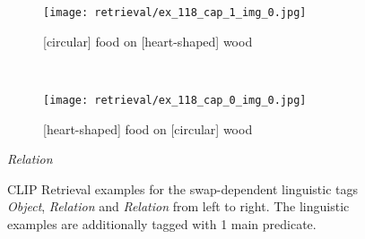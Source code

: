 \begin{figure}[ht]
\begin{minipage}[t]{.30\textwidth}
        \begin{subfigure}[t]{\textwidth}
        \centering
        \texttt{[image: retrieval/ex\_118\_cap\_1\_img\_0.jpg]}
        \caption{[circular] food on [heart-shaped] wood}
        \end{subfigure}\\
        \begin{subfigure}[t]{\textwidth}
        \centering
        \texttt{[image: retrieval/ex\_118\_cap\_0\_img\_0.jpg]}
        \caption{[heart-shaped] food on [circular] wood}
        \end{subfigure}%
        \caption*{\textit{Relation}}
    \end{minipage}%
    \caption{CLIP Retrieval examples for the swap-dependent linguistic tags \textit{Object}, \textit{Relation} and \textit{Relation} from left to right. The linguistic examples are additionally tagged with 1 main predicate.}
    \label{fig:retrieval-examples}
\end{figure}

